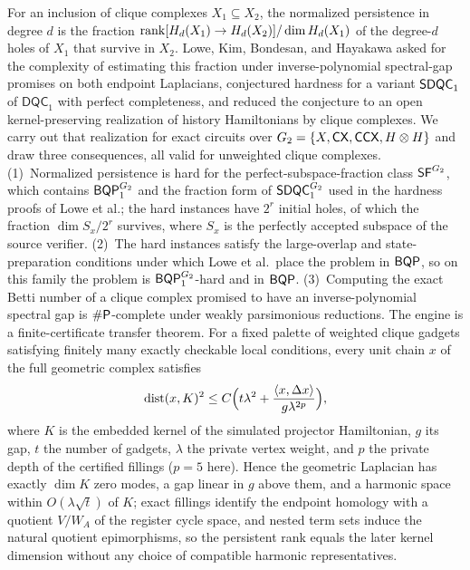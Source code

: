 For an inclusion of clique complexes \(X_1\subseteq X_2\), the normalized persistence in degree \(d\) is the fraction \(\operatorname{rank}[H_d(X_1)\to H_d(X_2)]/\dim H_d(X_1)\) of the degree-\(d\) holes of \(X_1\) that survive in \(X_2\). Lowe, Kim, Bondesan, and Hayakawa asked for the complexity of estimating this fraction under inverse-polynomial spectral-gap promises on both endpoint Laplacians, conjectured hardness for a variant \(\mathsf{SDQC}_{1}\) of \(\mathsf{DQC}_1\) with perfect completeness, and reduced the conjecture to an open kernel-preserving realization of history Hamiltonians by clique complexes.
We carry out that realization for exact circuits over \(G_2=\{X,\mathsf{CX},\mathsf{CCX},H\otimes H\}\) and draw three consequences, all valid for unweighted clique complexes.
(1)~Normalized persistence is hard for the perfect-subspace-fraction class \(\mathsf{SF}^{G_2}\), which contains \(\mathsf{BQP}_{1}^{G_2}\) and the fraction form of \(\mathsf{SDQC}_{1}^{G_2}\) used in the hardness proofs of Lowe et al.; the hard instances have \(2^{r}\) initial holes, of which the fraction \(\dim S_x/2^{r}\) survives, where \(S_x\) is the perfectly accepted subspace of the source verifier.
(2)~The hard instances satisfy the large-overlap and state-preparation conditions under which Lowe et al.\ place the problem in \(\mathsf{BQP}\), so on this family the problem is \(\mathsf{BQP}_{1}^{G_2}\)-hard and in \(\mathsf{BQP}\).
(3)~Computing the exact Betti number of a clique complex promised to have an inverse-polynomial spectral gap is \(\#\mathsf{P}\)-complete under weakly parsimonious reductions.
The engine is a finite-certificate transfer theorem. For a fixed palette of weighted clique gadgets satisfying finitely many exactly checkable local conditions, every unit chain \(x\) of the full geometric complex satisfies
\[
\operatorname{dist}(x,K)^2\le C\Bigl(t\lambda^2+\frac{\langle x,\Delta x\rangle}{g\lambda^{2p}}\Bigr),
\]
where \(K\) is the embedded kernel of the simulated projector Hamiltonian, \(g\) its gap, \(t\) the number of gadgets, \(\lambda\) the private vertex weight, and \(p\) the private depth of the certified fillings (\(p=5\) here). Hence the geometric Laplacian has exactly \(\dim K\) zero modes, a gap linear in \(g\) above them, and a harmonic space within \(O(\lambda\sqrt t)\) of \(K\); exact fillings identify the endpoint homology with a quotient \(V/W_A\) of the register cycle space, and nested term sets induce the natural quotient epimorphisms, so the persistent rank equals the later kernel dimension without any choice of compatible harmonic representatives.
